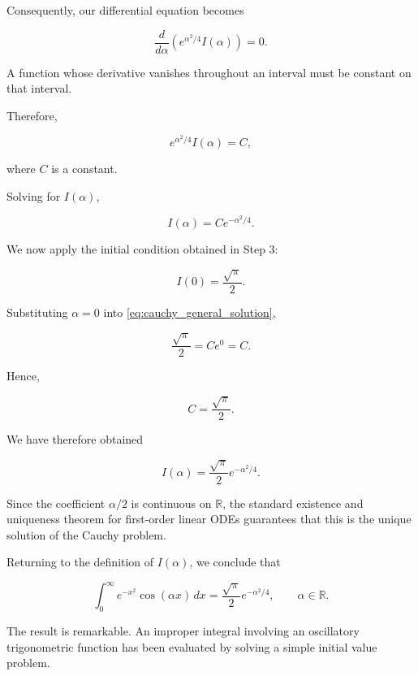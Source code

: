 \documentclass[11pt,a4paper]{article}
\theoremstyle{definition}
\theoremstyle{remark}
\begin{document}
Consequently, our differential
equation becomes

\begin{equation}
    \frac{d}{d\alpha}
    \left(
    e^{\alpha^2/4}I(\alpha)
    \right)
    =
    0.
\end{equation}

A function whose derivative
vanishes throughout an interval
must be constant on that interval.

Therefore,

\[
    e^{\alpha^2/4}I(\alpha)=C,
\]

where $C$ is a constant.

Solving for $I(\alpha)$,

\begin{equation}
    I(\alpha)
    =
    Ce^{-\alpha^2/4}.
    \label{eq:cauchy_general_solution}
\end{equation}

We now apply the initial
condition obtained in Step 3:

\[
    I(0)=\frac{\sqrt{\pi}}{2}.
\]

Substituting $\alpha=0$
into \eqref{eq:cauchy_general_solution},

\[
    \frac{\sqrt{\pi}}{2}
    =
    Ce^0=C.
\]

Hence,

\[
    C=\frac{\sqrt{\pi}}{2}.
\]

We have therefore obtained

\begin{equation}
    I(\alpha)
    =
    \frac{\sqrt{\pi}}{2}
    e^{-\alpha^2/4}.
\end{equation}

Since the coefficient
$\alpha/2$ is continuous
on $\mathbb{R}$, the
standard existence and
uniqueness theorem for
first-order linear ODEs
guarantees that this is
the unique solution
of the Cauchy problem.

Returning to the definition
of $I(\alpha)$, we conclude that

\begin{equation}
    \boxed{
    \int_0^\infty
    e^{-x^2}\cos(\alpha x)\,dx
    =
    \frac{\sqrt{\pi}}{2}
    e^{-\alpha^2/4},
    \qquad \alpha\in\mathbb{R}.
    }
    \label{eq:cauchy_final_result}
\end{equation}

\medskip

The result is remarkable.
An improper integral
involving an oscillatory
trigonometric function
has been evaluated by
solving a simple
initial value problem.
\end{document}
